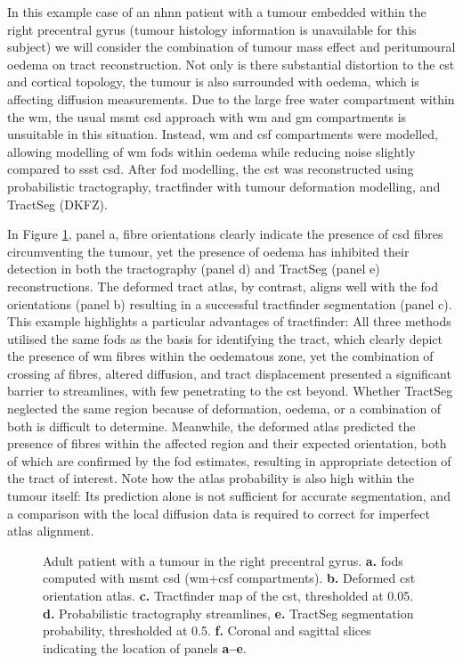 In this example case of an \gls{nhnn} patient with a tumour embedded within the right precentral gyrus (tumour histology information is unavailable for this subject) we will consider the combination of tumour mass effect and peritumoural oedema on tract reconstruction.
Not only is there substantial distortion to the \gls{cst} and cortical topology, the tumour is also surrounded with oedema, which is affecting diffusion measurements.
Due to the large free water compartment within the \gls{wm}, the usual \gls{msmt} \gls{csd} approach with \gls{wm} and \gls{gm} compartments is unsuitable in this situation.
Instead, \gls{wm} and \gls{csf} compartments were modelled, allowing modelling of \gls{wm} \glspl{fod} within oedema while reducing noise slightly compared to \gls{ssst} \gls{csd}.
After \gls{fod} modelling, the \gls{cst} was reconstructed using probabilistic tractography, tractfinder with tumour deformation modelling, and TractSeg (DKFZ).

In Figure \ref{fig:oedema}, panel a, fibre orientations clearly indicate the presence of \gls{csd} fibres circumventing the tumour, yet the presence of oedema has inhibited their detection in both the tractography (panel d) and TractSeg (panel e) reconstructions.
The deformed tract atlas, by contrast, aligns well with the \gls{fod} orientations (panel b) resulting in a successful tractfinder segmentation  (panel c).
This example highlights a particular advantages of tractfinder:
All three methods utilised the same \glspl{fod} as the basis for identifying the tract, which clearly depict the presence of \gls{wm} fibres within the oedematous zone, yet the combination of crossing \gls{af} fibres, altered diffusion, and tract displacement presented a significant barrier to streamlines, with few penetrating to the \gls{cst} beyond.
Whether TractSeg neglected the same region because of deformation, oedema, or a combination of both is difficult to determine.
Meanwhile, the deformed atlas predicted the presence of fibres within the affected region and their expected orientation, both of which are confirmed by the \gls{fod} estimates, resulting in appropriate detection of the tract of interest.
Note how the atlas probability is also high within the tumour itself:
Its prediction alone is not sufficient for accurate segmentation, and a comparison with the local diffusion data is required to correct for imperfect atlas alignment.

\begin{figure}
  
  \caption[Tumour deformation modelling and oedema]{Adult patient with a tumour in the right precentral gyrus.
  \textbf{\sffamily a.} \Glspl{fod} computed with \gls{msmt} \gls{csd} (\gls{wm}+\gls{csf} compartments).
  \textbf{\sffamily b.} Deformed \gls{cst} orientation atlas.
  \textbf{\sffamily c.} Tractfinder map of the \gls{cst}, thresholded at 0.05.
  \textbf{\sffamily d.} Probabilistic tractography streamlines, \textbf{e.} TractSeg segmentation probability, thresholded at 0.5.
  \textbf{\sffamily f.} Coronal and sagittal slices indicating the location of panels \textbf{\sffamily a--e}.}
  \label{fig:oedema}
\end{figure}

